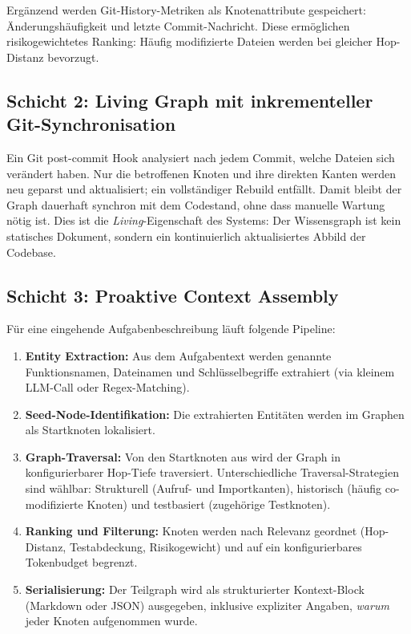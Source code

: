 \vspace{0.5em}

Ergänzend werden Git-History-Metriken als Knotenattribute gespeichert: Änderungshäufigkeit und letzte Commit-Nachricht. Diese ermöglichen risikogewichtetes Ranking: Häufig modifizierte Dateien werden bei gleicher Hop-Distanz bevorzugt.

\subsection*{Schicht 2: Living Graph mit inkrementeller Git-Synchronisation}

Ein Git post-commit Hook analysiert nach jedem Commit, welche Dateien sich verändert haben. Nur die betroffenen Knoten und ihre direkten Kanten werden neu geparst und aktualisiert; ein vollständiger Rebuild entfällt. Damit bleibt der Graph dauerhaft synchron mit dem Codestand, ohne dass manuelle Wartung nötig ist. Dies ist die \emph{Living}-Eigenschaft des Systems: Der Wissensgraph ist kein statisches Dokument, sondern ein kontinuierlich aktualisiertes Abbild der Codebase.

\subsection*{Schicht 3: Proaktive Context Assembly}

Für eine eingehende Aufgabenbeschreibung läuft folgende Pipeline:

\begin{enumerate}
  \item \textbf{Entity Extraction:} Aus dem Aufgabentext werden genannte Funktionsnamen, Dateinamen und Schlüsselbegriffe extrahiert (via kleinem LLM-Call oder Regex-Matching).
  \item \textbf{Seed-Node-Identifikation:} Die extrahierten Entitäten werden im Graphen als Startknoten lokalisiert.
  \item \textbf{Graph-Traversal:} Von den Startknoten aus wird der Graph in konfigurierbarer Hop-Tiefe traversiert. Unterschiedliche Traversal-Strategien sind wählbar: Strukturell (Aufruf- und Importkanten), historisch (häufig co-modifizierte Knoten) und testbasiert (zugehörige Testknoten).
  \item \textbf{Ranking und Filterung:} Knoten werden nach Relevanz geordnet (Hop-Distanz, Testabdeckung, Risikogewicht) und auf ein konfigurierbares Tokenbudget begrenzt.
  \item \textbf{Serialisierung:} Der Teilgraph wird als strukturierter Kontext-Block (Markdown oder JSON) ausgegeben, inklusive expliziter Angaben, \emph{warum} jeder Knoten aufgenommen wurde.
\end{enumerate}

